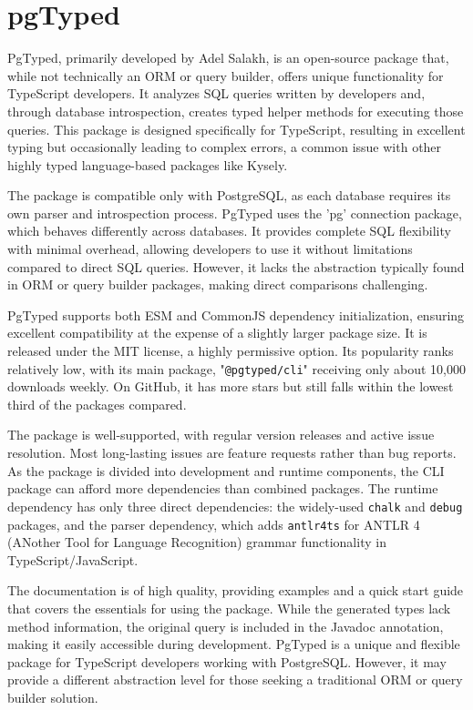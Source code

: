 \section{pgTyped}
PgTyped, primarily developed by Adel Salakh, is an open-source package that,
while not technically an ORM or query builder, offers unique functionality for
TypeScript developers. It analyzes SQL queries written by developers and,
through database introspection, creates typed helper methods for executing those
queries. This package is designed specifically for TypeScript, resulting in
excellent typing but occasionally leading to complex errors, a common issue with
other highly typed language-based packages like Kysely.

The package is compatible only with PostgreSQL, as each database requires its
own parser and introspection process. PgTyped uses the 'pg' connection package,
which behaves differently across databases. It provides complete SQL flexibility
with minimal overhead, allowing developers to use it without limitations
compared to direct SQL queries. However, it lacks the abstraction typically
found in ORM or query builder packages, making direct comparisons challenging.

PgTyped supports both ESM and CommonJS dependency initialization, ensuring
excellent compatibility at the expense of a slightly larger package size. It is
released under the MIT license, a highly permissive option. Its popularity ranks
relatively low, with its main package, "\texttt{@pgtyped/cli}" receiving only
about 10,000 downloads weekly. On GitHub, it has more stars but still falls
within the lowest third of the packages compared.

The package is well-supported, with regular version releases and active issue
resolution. Most long-lasting issues are feature requests rather than bug
reports. As the package is divided into development and runtime components, the
CLI package can afford more dependencies than combined packages. The runtime
dependency has only three direct dependencies: the widely-used \texttt{chalk}
and \texttt{debug} packages, and the parser dependency, which adds
\texttt{antlr4ts} for ANTLR 4 (ANother Tool for Language Recognition) grammar
functionality in TypeScript/JavaScript.

The documentation is of high quality, providing examples and a quick start guide
that covers the essentials for using the package. While the generated types lack
method information, the original query is included in the Javadoc annotation,
making it easily accessible during development. PgTyped is a unique and flexible
package for TypeScript developers working with PostgreSQL. However, it may
provide a different abstraction level for those seeking a traditional ORM or
query builder solution.

